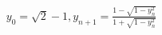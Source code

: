 \documentclass[preview]{standalone}
\begin{document}
\begin{align*}
y_0 = \sqrt{2}-1, y_{n+1} = \frac{1-\sqrt{1-y_n^2}}{1+\sqrt{1-y_n^2}}
\end{align*}
\end{document}
